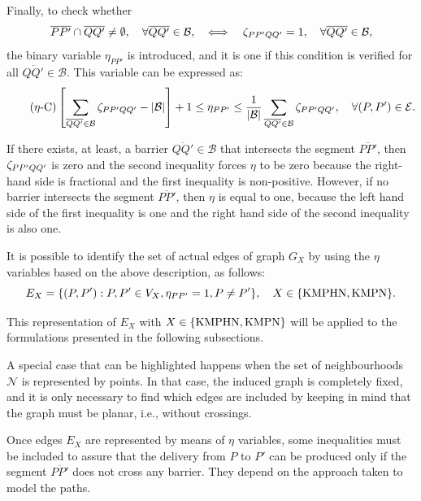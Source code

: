 \documentclass[a4paper,  review, authoryear, 1p.]{elsarticle}
\newcommand{\B}{{\mathcal B}}
\newcommand{\EB}{{E^{}_{\mathcal B}}}
\newcommand{\segment}[2]{\overline{#1#2}}
\begin{document}
	\newcommand{\etavar}[2]{\eta_{#1#2}}
	
	Finally, to check whether
	$$\overline{PP'}\cap \overline{QQ'}\neq\emptyset,\quad \forall \overline{QQ'}\in\B,\quad\Longleftrightarrow\quad \zetacheck{P}{P'}{Q}{Q'}=1,\quad\forall \overline{QQ'}\in\B,$$
	the binary variable $\etavar{P}{P'}$ is introduced, and it is one if this condition is verified for all $\overline{QQ'}\in\B$. This variable can be expressed as: 
	\begin{equation*}\tag{$\eta$-C}\label{eq:etaC}
		\left[\sum_{\overline{QQ'}\in\mathcal B}\zetacheck{P}{P'}{Q}{Q'}-|\mathcal B|\right] + 1\leq \etavar{P}{P'}\leq \frac{1}{|\B|}\sum_{\overline{QQ'}\in\mathcal B}\zetacheck{P}{P'}{Q}{Q'},\quad\forall (P,P')\in\mathcal E.
	\end{equation*}
	
	If there exists, at least, a barrier $\overline{QQ'}\in\B$ that intersects the segment $\overline{PP'}$, then $\zeta_{PP'QQ'}$ is zero and the second inequality forces $\eta$ to be zero because the right-hand side is fractional and the first inequality is non-positive. However, if no barrier intersects the segment $\segment{P}{P'}$, then $\eta$ is equal to one, because the left hand side of the first inequality is one and the right hand side of the second inequality is also one.
	
	It is possible to identify the set of actual edges of graph $G_X$ by using the $\eta$ variables based on the above description, as follows:
	$$ E_X = \{(P, P'):P,P'\in V_X,\etavar{P}{P'}=1, P\neq P'\}, \quad X\in \{\rm KMPHN, \rm KMPN\}.$$
	
	This representation of $E_X$ with $X\in \{\rm KMPHN, \rm KMPN\}$ will be applied to the formulations presented in the following subsections. 
	
	A special case that can be highlighted happens when the set of neighbourhoods $\mathcal N$ is represented by points. In that case, the induced graph is completely fixed, and it is only necessary to find which edges are included by keeping in mind that the graph must be planar, i.e., without crossings.
	
	Once edges $E_X$ are represented by means of $\eta$ variables, some inequalities must be included to assure that the delivery from $P$ to $P'$ can be produced only if the segment $\segment{P}{P'}$ does not cross any barrier. They depend on the approach taken to model the paths.
	
\end{document}
